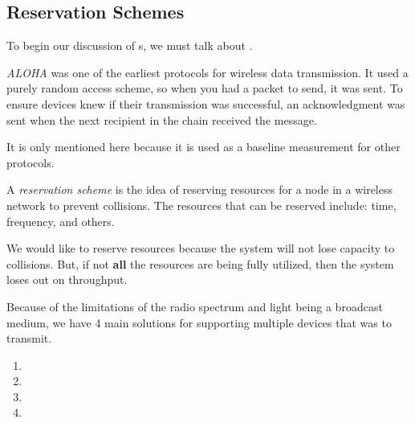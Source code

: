 \subsection{Reservation Schemes}\label{subsec:Reservation_Scheme}
To begin our discussion of s, we must talk about .

\begin{definition}[ALOHA]\label{def:ALOHA}
  \emph{ALOHA} was one of the earliest protocols for wireless data transmission.
  It used a purely random access scheme, so when you had a packet to send, it was sent.
  To ensure devices knew if their transmission was successful, an acknowledgment was sent when the next recipient in the chain received the message.

  \begin{remark}
    It is only mentioned here because it is used as a baseline measurement for other protocols.
  \end{remark}
\end{definition}

\begin{definition}\label{def:Reservation_Scheme}
  A \emph{reservation scheme} is the idea of reserving resources for a node in a wireless network to prevent collisions.
  The resources that can be reserved include: time, frequency, and others.

  We would like to reserve resources because the system will not lose capacity to collisions.
  But, if not \textbf{all} the resources are being fully utilized, then the system loses out on throughput.

  Because of the limitations of the radio spectrum and light being a broadcast medium, we have 4 main solutions for supporting multiple devices that was to transmit.
  \begin{enumerate}[noitemsep]
  \item {}
  \item {}
  \item {}
  \item {}
  \end{enumerate}
\end{definition}

